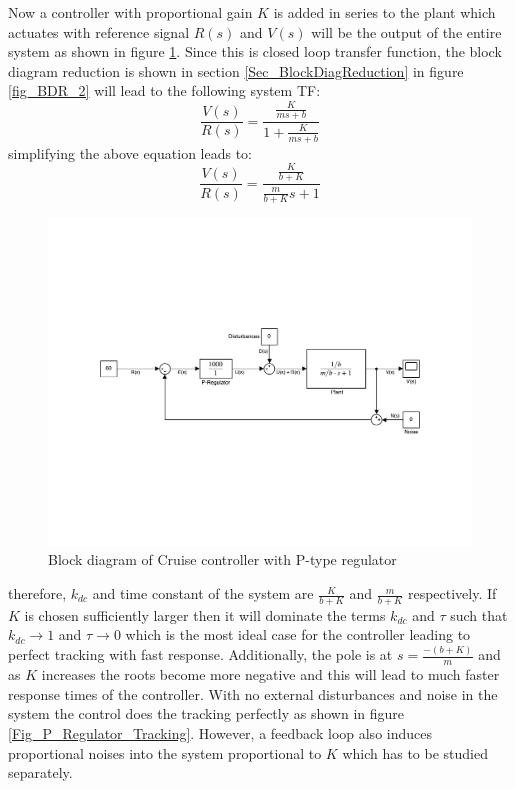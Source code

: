 Now a controller with proportional gain $K$ is added in series to the plant which actuates with reference signal $R(s)$ and $V(s)$ will be the output of the entire system as shown in figure \ref{Fig_CruiseControlPRegulator}. Since this is closed loop transfer function, the block diagram reduction is shown in section \ref{Sec_BlockDiagReduction} in figure \ref{fig_BDR_2} will lead to the following system TF:
\begin{equation}
	\frac{V(s)}{R(s)} = \frac{\frac{K}{ms+b}}{1 + \frac{K}{ms+b}}
\end{equation}
simplifying the above equation leads to:
\begin{equation}
	\frac{V(s)}{R(s)} = \frac{\frac{K}{b + K}}{\frac{m}{b + K}s + 1}
\end{equation}
\begin{figure}[h!]
	\centering
	\includegraphics[width=\textwidth]{Bilder/Cruise_Control_P_Regulator.pdf}
	\caption{Block diagram of Cruise controller with P-type regulator}
	\label{Fig_CruiseControlPRegulator}
\end{figure}
therefore, $k_{dc}$ and time constant of the system are $\frac{K}{b + K}$ and $\frac{m}{b + K}$ respectively. If $K$ is chosen sufficiently larger then it will dominate the terms $k_{dc}$ and $\tau$ such that $k_{dc} \rightarrow 1$ and $\tau \rightarrow 0$ which is the most ideal case for the controller leading to perfect tracking with fast response. Additionally, the pole is at $s = \frac{-(b + K)}{m}$ and as $K$ increases the roots become more negative and this will lead to much faster response times of the controller. With no external disturbances and noise in the system the control does the tracking perfectly as shown in figure \ref{Fig_P_Regulator_Tracking}. However, a feedback loop also induces proportional noises into the system proportional to $K$ which has to be studied separately.
